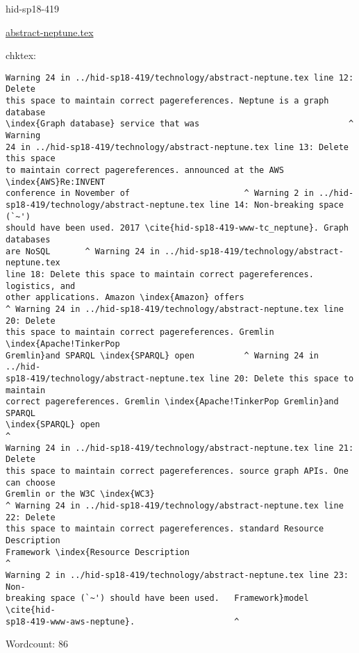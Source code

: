 \begin{IU}

hid-sp18-419

\href{https://github.com/cloudmesh-community/hid-sp18-419/blob/master//technology/abstract-neptune.tex}{abstract-neptune.tex}

 
chktex:
\begin{tiny}
\begin{verbatim}
Warning 24 in ../hid-sp18-419/technology/abstract-neptune.tex line 12: Delete
this space to maintain correct pagereferences. Neptune is a graph database
\index{Graph database} service that was                              ^ Warning
24 in ../hid-sp18-419/technology/abstract-neptune.tex line 13: Delete this space
to maintain correct pagereferences. announced at the AWS \index{AWS}Re:INVENT
conference in November of                       ^ Warning 2 in ../hid-
sp18-419/technology/abstract-neptune.tex line 14: Non-breaking space (`~')
should have been used. 2017 \cite{hid-sp18-419-www-tc_neptune}. Graph databases
are NoSQL       ^ Warning 24 in ../hid-sp18-419/technology/abstract-neptune.tex
line 18: Delete this space to maintain correct pagereferences. logistics, and
other applications. Amazon \index{Amazon} offers
^ Warning 24 in ../hid-sp18-419/technology/abstract-neptune.tex line 20: Delete
this space to maintain correct pagereferences. Gremlin \index{Apache!TinkerPop
Gremlin}and SPARQL \index{SPARQL} open          ^ Warning 24 in ../hid-
sp18-419/technology/abstract-neptune.tex line 20: Delete this space to maintain
correct pagereferences. Gremlin \index{Apache!TinkerPop Gremlin}and SPARQL
\index{SPARQL} open                                                     ^
Warning 24 in ../hid-sp18-419/technology/abstract-neptune.tex line 21: Delete
this space to maintain correct pagereferences. source graph APIs. One can choose
Gremlin or the W3C \index{WC3}
^ Warning 24 in ../hid-sp18-419/technology/abstract-neptune.tex line 22: Delete
this space to maintain correct pagereferences. standard Resource Description
Framework \index{Resource Description                                          ^
Warning 2 in ../hid-sp18-419/technology/abstract-neptune.tex line 23: Non-
breaking space (`~') should have been used.   Framework}model \cite{hid-
sp18-419-www-aws-neptune}.                    ^
\end{verbatim}
\end{tiny}

Wordcount: 86

\end{IU}

